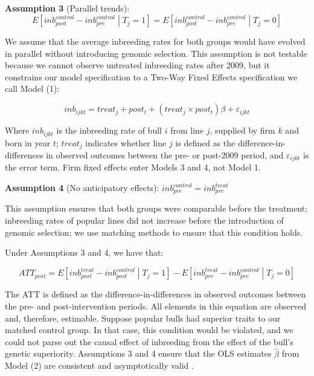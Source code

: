 \documentclass[12pt,letterpaper]{article}
\begin{document}
\medskip
\textbf{Assumption 3} (Parallel trends): 
\begin{equation*}
    E\left[inb_{post}^{control}-inb_{pre}^{control}\middle| T_{j}=1\right] = E\left[inb_{post}^{control}-inb_{pre}^{control} \middle| T_{j}=0\right]
\end{equation*}

We assume that the average inbreeding rates for both groups would have evolved in parallel without introducing genomic selection. This assumption is not testable because we cannot observe untreated inbreeding rates after 2009, but it constrains our model specification to a Two-Way Fixed Effects specification we call Model (1):

\begin{equation}
inb_{ijkt} = treat_{j}+post_{t}+(treat_{j}\times post_{t})\beta+\varepsilon_{ijkt}\tag{Model 1}
\end{equation}

Where $inb_{ijkt}$ is the inbreeding rate of bull $i$ from line $j$, supplied by firm $k$ and born in year $t$; $treat_{j}$ indicates whether line $ j$ is defined as the difference-in-differences in observed outcomes between the pre- or post-2009 period, and $\varepsilon_{ijkt}$ is the error term. Firm fixed effects enter Models 3 and 4, not Model 1. 

\medskip
\textbf{Assumption 4} (No anticipatory effects): $inb_{pre}^{control}=inb_{pre}^{treat}$

This assumption ensures that both groups were comparable before the treatment; inbreeding rates of popular lines did not increase before the introduction of genomic selection; we use matching methods to ensure that this condition holds. 

Under Assumptions 3 and 4, we have that:

\begin{equation}
    ATT_{post}=E\left[inb_{post}^{treat}-inb_{post}^{control} \middle| T_{j}=1\right]-E\left[inb_{pre}^{treat}-inb_{pre}^{control} \middle| T_{j}=0\right]
\end{equation}

The ATT is defined as the difference-in-differences in observed outcomes between the pre- and post-intervention periods. All elements in this equation are observed and, therefore, estimable. Suppose popular bulls had superior traits to our matched control group. In that case, this condition would be violated, and we could not parse out the causal effect of inbreeding from the effect of the bull's genetic superiority. Assumptions 3 and 4 ensure that the OLS estimates $\hat{\beta}$ from Model (2) are consistent and asymptotically valid \citep{Roth2023}.
\end{document}
